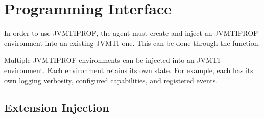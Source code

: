 


\section{Programming Interface} \label{sec:api}

In order to use JVMTIPROF, the agent must create and inject an JVMTIPROF environment into an existing JVMTI one. This can be done through the \hyperref[api:jvmtiProf_Create]{} function.

Multiple JVMTIPROF environments can be injected into an JVMTI environment. Each environment retains its own state. For example, each has its own logging verbosity, configured capabilities, and registered events.





\subsection{Extension Injection}

